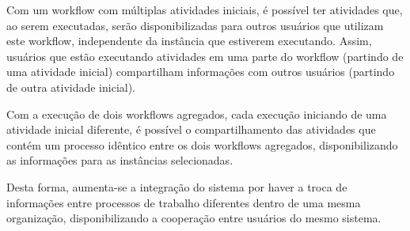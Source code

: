 Com um workflow com múltiplas atividades iniciais, é possível ter atividades que, ao serem executadas, serão disponibilizadas para outros usuários que utilizam este workflow, independente da instância que estiverem executando. Assim, usuários que estão executando atividades em uma parte do workflow (partindo de uma atividade inicial) compartilham informações com outros usuários (partindo de outra atividade inicial).

Com a execução de dois workflows agregados, cada execução iniciando de uma atividade inicial diferente, é possível o compartilhamento das atividades que contém um processo idêntico entre os dois workflows agregados, disponibilizando as informações para as instâncias selecionadas.

Desta forma, aumenta-se a integração do sistema por haver a troca de informações entre processos de trabalho diferentes dentro de uma mesma organização, disponibilizando a cooperação entre usuários do mesmo sistema.